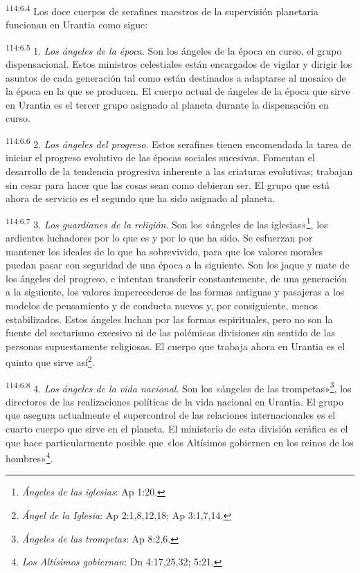 \par
\textsuperscript{114:6.4} Los doce cuerpos de serafines maestros de la supervisión planetaria funcionan en Urantia como sigue:

\par
\textsuperscript{114:6.5} 1. \textit{Los ángeles de la época}. Son los ángeles de la época en curso, el grupo dispensacional. Estos ministros celestiales están encargados de vigilar y dirigir los asuntos de cada generación tal como están destinados a adaptarse al mosaico de la época en la que se producen. El cuerpo actual de ángeles de la época que sirve en Urantia es el tercer grupo asignado al planeta durante la dispensación en curso.

\par
\textsuperscript{114:6.6} 2. \textit{Los ángeles del progreso}. Estos serafines tienen encomendada la tarea de iniciar el progreso evolutivo de las épocas sociales sucesivas. Fomentan el desarrollo de la tendencia progresiva inherente a las criaturas evolutivas; trabajan sin cesar para hacer que las cosas sean como debieran ser. El grupo que está ahora de servicio es el segundo que ha sido asignado al planeta.

\par
\textsuperscript{114:6.7} 3. \textit{Los guardianes de la religión}. Son los «ángeles de las iglesias»\footnote{\textit{Ángeles de las iglesias}: Ap 1:20.}, los ardientes luchadores por lo que es y por lo que ha sido. Se esfuerzan por mantener los ideales de lo que ha sobrevivido, para que los valores morales puedan pasar con seguridad de una época a la siguiente. Son los jaque y mate de los ángeles del progreso, e intentan transferir constantemente, de una generación a la siguiente, los valores imperecederos de las formas antiguas y pasajeras a los modelos de pensamiento y de conducta nuevos y, por consiguiente, menos estabilizados. Estos ángeles luchan por las formas espirituales, pero no son la fuente del sectarismo excesivo ni de las polémicas divisiones sin sentido de las personas supuestamente religiosas. El cuerpo que trabaja ahora en Urantia es el quinto que sirve así\footnote{\textit{Ángel de la Iglesia}: Ap 2:1,8,12,18; Ap 3:1,7,14.}.

\par
\textsuperscript{114:6.8} 4. \textit{Los ángeles de la vida nacional}. Son los «ángeles de las trompetas»\footnote{\textit{Ángeles de las trompetas}: Ap 8:2,6.}, los directores de las realizaciones políticas de la vida nacional en Urantia. El grupo que asegura actualmente el supercontrol de las relaciones internacionales es el cuarto cuerpo que sirve en el planeta. El ministerio de esta división seráfica es el que hace particularmente posible que «los Altísimos gobiernen en los reinos de los hombres»\footnote{\textit{Los Altísimos gobiernan}: Dn 4:17,25,32; 5:21.}.

